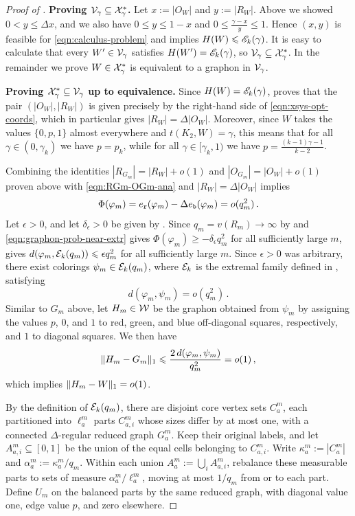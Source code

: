 \begin{proof}[Proof of ]
\smallskip
\noindent\textbf{Proving ${\mathcal V}_\gamma\subseteq{\mathcal X}^\ast_\gamma$.}
Let $x:=|O_W|$ and $y:=|R_W|$. Above we showed $0<y\leq\Delta x$, and we also have $0\leq y\leq 1-x$ and $0\leq\frac{\gamma-x}{y}\leq1$. Hence $(x,y)$ is feasible for \eqref{eqn:calculus-problem} and  implies $H(W)\leqslant {\mathscr E}_k(\gamma)$. It is easy to calculate that every $W'\in{\mathcal V}_\gamma$ satisfies $H(W')={\mathscr E}_k(\gamma)$, so ${\mathcal V}_\gamma\subseteq{\mathcal X}^\ast_\gamma$. In the remainder we prove $W\in{\mathcal X}^\ast_\gamma$ is equivalent to a graphon in ${\mathcal V}_\gamma$.

\smallskip
\noindent\textbf{Proving ${\mathcal X}^\ast_\gamma\subseteq{\mathcal V}_\gamma$ up to equivalence.} Since $H(W)={\mathscr E}_k(\gamma)$,  proves that the pair $(|O_W|,|R_W|)$ is given precisely by the right-hand side of \eqref{eqn:xsys-opt-coords}, which in particular gives $|R_W|=\Delta|O_W|$.
Moreover, since $W$ takes the values $\{0,p,1\}$ almost everywhere and $t(K_2,W)=\gamma$, this means that for all $\gamma\in(0,\gamma_k)$ we have $p=p_k$, while for all $\gamma\in[\gamma_k,1)$ we have $p=\frac{(k-1)\gamma-1}{k-2}$.

Combining the identities $|R_{G_m}|=|R_W|+o(1)$ and $|O_{G_m}|=|O_W|+o(1)$ proven above with \eqref{eqn:RGm-OGm-ana} and $|R_W|=\Delta|O_W|$ implies
\begin{equation}\label{eqn:graphon-prob-near-extr}
\Phi(\varphi_m)=e_{\normalfont\texttt r}(\varphi_m)-\Delta e_{\normalfont\texttt b}(\varphi_m)=o(q_m^2)\,.
\end{equation}
Let $\epsilon>0$, and let $\delta_{\epsilon}>0$ be given by . Since $q_m=v(R_m)\to\infty$ by  and \eqref{eqn:graphon-prob-near-extr} gives $\Phi(\varphi_m)\geq-\delta_{\epsilon}q_m^2$ for all sufficiently large $m$,  gives $d(\varphi_m,{\mathcal E}_k(q_m))\leqslant\epsilon q_m^2$ for all sufficiently large $m$. Since $\epsilon>0$ was arbitrary, there exist colorings $\psi_m\in{\mathcal E}_k(q_m)$, where ${\mathcal E}_k$ is the extremal family defined in , satisfying
$$d(\varphi_m,\psi_m)=o(q_m^2)\,.$$
Similar to $G_m$ above, let $H_m\in{\mathcal W}$ be the graphon obtained from $\psi_m$ by assigning the values $p$, $0$, and $1$ to red, green, and blue off-diagonal squares, respectively, and $1$ to diagonal squares. We then have
$$\lVert H_m-G_m\rVert_1\leqslant \frac{2\,d(\varphi_m,\psi_m)}{q_m^2}=o(1)\,,$$
which implies $\lVert H_m-W\rVert_1=o(1)$.

By the definition of ${\mathcal E}_k(q_m)$, there are disjoint core vertex sets $C_a^m$, each partitioned into $\ell_a^m$ parts $C_{a,i}^m$ whose sizes differ by at most one, with a connected $\Delta$-regular reduced graph $G_a^m$. Keep their original labels, and let $A_{a,i}^m\subseteq[0,1]$ be the union of the equal cells belonging to $C_{a,i}^m$. Write $\kappa_a^m:=|C_a^m|$ and $\alpha_a^m:=\kappa_a^m/q_m$. Within each union $A_a^m:=\bigcup_i A_{a,i}^m$, rebalance these measurable parts to sets of measure $\alpha_a^m/\ell_a^m$, moving at most $1/q_m$ from or to each part. Define $U_m$ on the balanced parts by the same reduced graph, with diagonal value one, edge value $p$, and zero elsewhere.


\end{proof}
